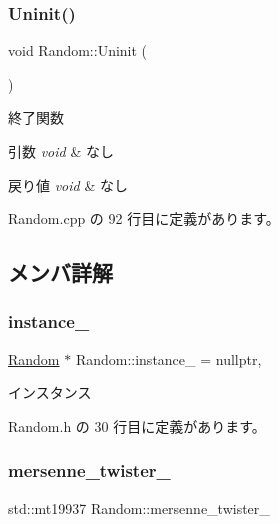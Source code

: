 \subsubsection{\texorpdfstring{Uninit()}{Uninit()}}
{\footnotesize\ttfamily void Random\+::\+Uninit (\begin{DoxyParamCaption}{ }\end{DoxyParamCaption})}



終了関数 


\begin{DoxyParams}{引数}
{\em void} & なし \\
\hline
\end{DoxyParams}

\begin{DoxyRetVals}{戻り値}
{\em void} & なし \\
\hline
\end{DoxyRetVals}


 Random.\+cpp の 92 行目に定義があります。



\subsection{メンバ詳解}
\mbox{\label{class_random_a7fda13c77002515c81152b21b6d92e9e}} 
\subsubsection{\texorpdfstring{instance\+\_\+}{instance\_}}
{\footnotesize\ttfamily \mbox{\hyperlink{class_random}{Random}} $\ast$ Random\+::instance\+\_\+ = nullptr\hspace{0.3cm}{\ttfamily [static]}, {\ttfamily [private]}}



インスタンス 



 Random.\+h の 30 行目に定義があります。

\mbox{\label{class_random_a149a0bd07119c7e33a4b838be0c53da9}} 
\subsubsection{\texorpdfstring{mersenne\+\_\+twister\+\_\+}{mersenne\_twister\_}}
{\footnotesize\ttfamily std\+::mt19937 Random\+::mersenne\+\_\+twister\+\_\+\hspace{0.3cm}{\ttfamily [private]}}



